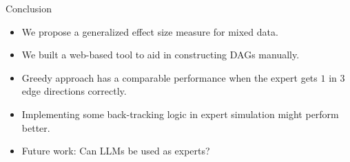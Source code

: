 \documentclass{beamer}
\begin{document}
\begin{frame}{Conclusion}
	\begin{itemize}
		\item We propose a generalized effect size measure for mixed data.
		\item We built a web-based tool to aid in constructing DAGs manually.
		\item Greedy approach has a comparable performance when the expert gets $ 1 $ in $ 3 $ edge directions correctly.
		\item Implementing some back-tracking logic in expert simulation might perform better.
		\item Future work: Can LLMs be used as experts?
	\end{itemize}
\end{frame}
\end{document}
